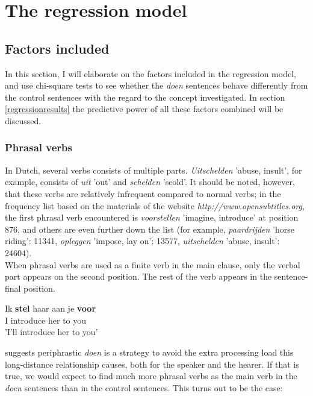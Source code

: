 \documentclass[12pt]{article}
\begin{document}
\section{The regression model} \label{regression}

\subsection{Factors included}

In this section, I will elaborate on the factors included in the regression model, and use chi-square tests to see whether the \emph{doen} sentences behave differently from the control sentences with the regard to the concept investigated. In section \ref{regressionresults} the predictive power of all these factors combined will be discussed.

\subsubsection{Phrasal verbs}
In Dutch, several verbs consists of multiple parts. \emph{Uitschelden} 'abuse, insult', for example, consists of \emph{uit} 'out' and \emph{schelden} 'scold'. It should be noted, however, that these verbs are relatively infrequent compared to normal verbs; in the frequency list based on the materials of the website \emph{http://www.opensubtitles.org}, the first phrasal verb encountered is \emph{voorstellen} 'imagine, introduce' at position 876, and others are even further down the list (for example, \emph{paardrijden} 'horse riding': 11341, \emph{opleggen} 'impose, lay on': 13577, \emph{uitschelden} 'abuse, insult': 24604).\\\indent
When phrasal verbs are used as a finite verb in the main clause, only the verbal part appears on the second position. The rest of the verb appears in the sentence-final position.

\begin{exe}
\ex \gll Ik \textbf{stel} haar aan je \textbf{voor}\\
I introduce her to you\\
'I'll introduce her to you'
\end{exe}

\citet[pp. 156]{n62} suggests periphrastic \emph{doen} is a strategy to avoid the extra processing load this long-distance relationship causes, both for the speaker and the hearer. If that is true, we would expect to find much more phrasal verbs as the main verb in the \emph{doen} sentences than in the control sentences. This turns out to be the case:
\end{document}
